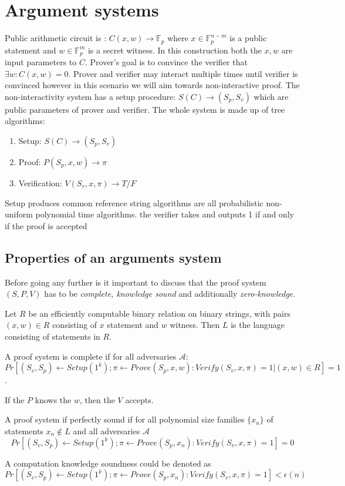\section{Argument systems}
Public arithmetic circuit is : $C(x, w) \rightarrow \mathbb{F}_p$ where $x \in \mathbb{F}_p^{n-m}$ is a public statement and $w \in \mathbb{F}_p^m$ is a secret witness. In this construction both the $x, w$ are input parameters to $C$. Prover's goal is to convince the verifier that $\exists w: C(x, w) = 0$. Prover and verifier may interact multiple times until verifier is convinced however in this scenario we will aim towards non-interactive proof. The non-interactivity system has a setup procedure: $S(C) \rightarrow (S_p, S_v)$ which are public parameters of prover and verifier. The whole system is made up of tree algorithms:
\begin{enumerate}
    \item Setup: $S(C) \rightarrow (S_p, S_v)$
    \item Proof: $P(S_p, x, w) \rightarrow \pi$
    \item Verification: $V(S_v, x, \pi) \rightarrow T/F$
\end{enumerate}

Setup produces common reference string 
algorithms are all probabilistic non-uniform polynomial time algorithms.
the verifier takes and outputs 1 if and only if the proof is accepted


\subsection{Properties of an arguments system}
Before going any further is it important to discuss that the proof system $(S, P, V)$ has to be \textit{complete, knowledge sound} and additionally  \textit{zero-knowledge}.

Let $R$ be an efficiently computable binary relation on binary strings, with pairs $(x, w) \in R$ consisting of $x$ statement and $w$ witness. Then $L$ is the language consisting of statements in $R$. 

\begin{definition}
    A proof system is complete if for all adversaries $\mathcal{A}$: $Pr[(S_v, S_p) \leftarrow Setup(1^k); \pi \leftarrow Prove(S_p, x, w): Verify(S_v, x, \pi) = 1 | (x, w) \in R] = 1$.
\end{definition}

If the $P$ knows the $w$, then the $V$ accepts.

\begin{definition}
    A proof system if perfectly sound if for all polynomial size families $\{x_n\}$ of statements $x_n \notin L$ and all adversaries $\mathcal{A}$
    $$Pr[(S_v, S_p) \leftarrow Setup(1^k); \pi \leftarrow Prove(S_p, x_n): Verify(S_v, x, \pi) = 1] = 0 $$

    A computation knowledge soundness could be denoted as
    $$Pr[(S_v, S_p) \leftarrow Setup(1^k); \pi \leftarrow Prove(S_p, x_n): Verify(S_v, x, \pi) = 1] < \epsilon(n) $$
\end{definition}

